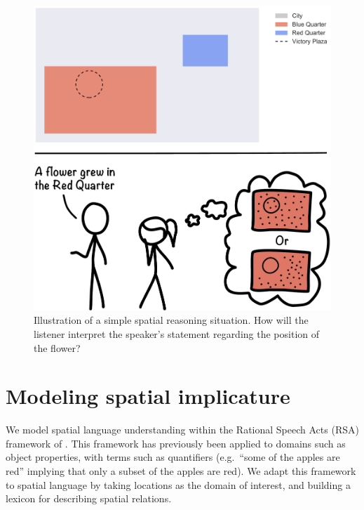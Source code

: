 \documentclass[10pt,letterpaper]{article}
\begin{document}

\begin{figure}[h]
\center
\includegraphics[width=.5\textwidth]{figures/illustration2.pdf}
\caption{Illustration of a simple spatial reasoning situation. How will the listener interpret the speaker's statement regarding the position of the flower?}
\label{fig:illustration}
\end{figure}

\section{Modeling spatial implicature}\label{mod}

We model spatial language understanding within the Rational Speech Acts (RSA) framework of . This framework has previously been applied to domains such as object properties, with terms such as quantifiers (e.g.~``some of the apples are red'' implying that only a subset of the apples are red). We adapt this framework to spatial language by taking locations as the domain of interest, and building a lexicon for describing spatial relations. 
\end{document}
